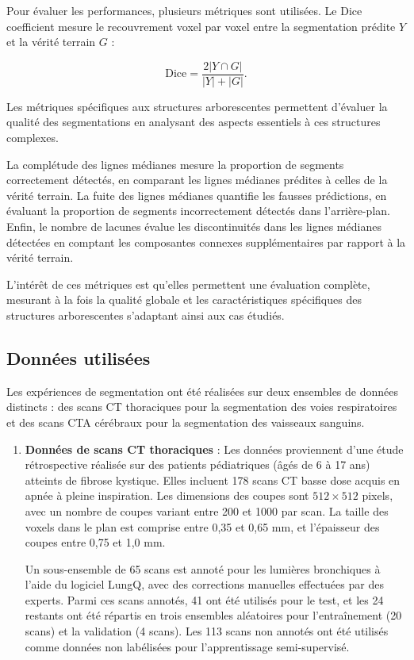 \documentclass[a4paper,12pt]{article}
\begin{document}
\begin{multicols}{2}
Pour évaluer les performances, plusieurs métriques sont utilisées. Le Dice coefficient mesure
le recouvrement voxel par voxel entre la segmentation prédite \(Y\) et la vérité terrain \(G\) :


\[
\text{Dice} = \frac{2|Y \cap G|}{|Y| + |G|}.
\]

Les métriques spécifiques aux structures arborescentes permettent d’évaluer la qualité des segmentations en analysant des aspects essentiels à ces structures complexes.

La complétude des lignes médianes mesure la proportion de segments correctement détectés,
en comparant les lignes médianes prédites à celles de la vérité terrain. La fuite des lignes médianes
quantifie les fausses prédictions, en évaluant la proportion de segments incorrectement détectés
dans l’arrière-plan. Enfin, le nombre de lacunes évalue les discontinuités dans les lignes médianes
détectées en comptant les composantes connexes supplémentaires par rapport à la vérité terrain.

L’intérêt de ces métriques est qu’elles permettent une évaluation complète, mesurant à la fois
la qualité globale et les caractéristiques spécifiques des structures arborescentes s’adaptant ainsi
aux cas étudiés.


\subsection*{Données utilisées}

Les expériences de segmentation ont été réalisées sur deux ensembles de données distincts : des
scans CT thoraciques pour la segmentation des voies respiratoires et des scans CTA cérébraux
pour la segmentation des vaisseaux sanguins.

\begin{enumerate}
    \item \textbf{Données de scans CT thoraciques} : Les données proviennent d’une étude rétrospective réalisée
    sur des patients pédiatriques (âgés de 6 à 17 ans) atteints de fibrose kystique. Elles incluent 178
    scans CT basse dose acquis en apnée à pleine inspiration. Les dimensions des coupes sont
    \(512 \times 512\) pixels, avec un nombre de coupes variant entre 200 et 1000 par scan. La taille des
    voxels dans le plan est comprise entre 0,35 et 0,65 mm, et l’épaisseur des coupes entre 0,75 et
    1,0 mm.

    Un sous-ensemble de 65 scans est annoté pour les lumières bronchiques à l’aide du logiciel
    LungQ, avec des corrections manuelles effectuées par des experts. Parmi ces scans annotés, 41
    ont été utilisés pour le test, et les 24 restants ont été répartis en trois ensembles aléatoires pour
    l’entraînement (20 scans) et la validation (4 scans). Les 113 scans non annotés ont été utilisés
    comme données non labélisées pour l’apprentissage semi-supervisé.


\end{enumerate}
\end{multicols}
\end{document}
